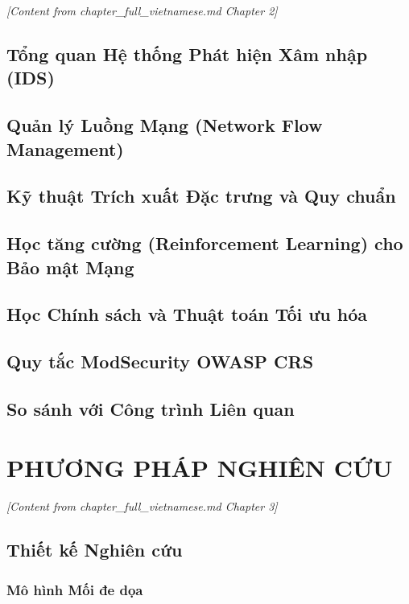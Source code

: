 \documentclass[12pt,a4paper,twoside]{report}
\begin{document}
\textit{[Content from chapter\_full\_vietnamese.md Chapter 2]}

\section{Tổng quan Hệ thống Phát hiện Xâm nhập (IDS)}

\section{Quản lý Luồng Mạng (Network Flow Management)}

\section{Kỹ thuật Trích xuất Đặc trưng và Quy chuẩn}

\section{Học tăng cường (Reinforcement Learning) cho Bảo mật Mạng}

\section{Học Chính sách và Thuật toán Tối ưu hóa}

\section{Quy tắc ModSecurity OWASP CRS}

\section{So sánh với Công trình Liên quan}

\chapter{PHƯƠNG PHÁP NGHIÊN CỨU}

\textit{[Content from chapter\_full\_vietnamese.md Chapter 3]}

\section{Thiết kế Nghiên cứu}

\subsection{Mô hình Mối đe dọa}
\end{document}
